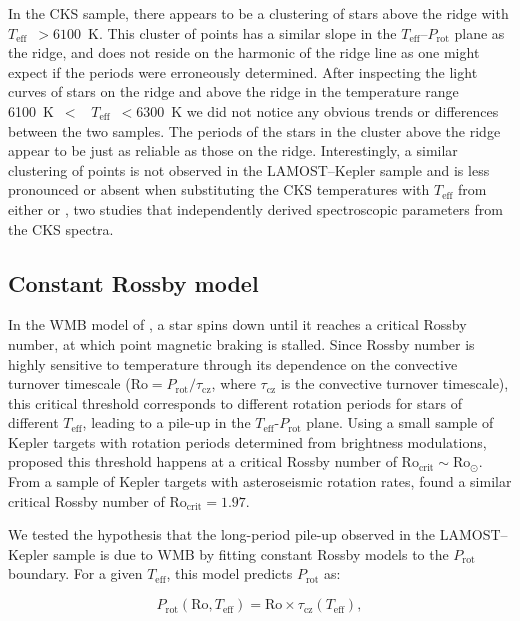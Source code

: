 \documentclass[linenumbers,tighten,trackchanges,twocolumn]{aastex631}
\newcommand{\teff}{\ensuremath{T_{\mathrm{eff}}}\xspace}
\newcommand{\prot}{\ensuremath{P_\mathrm{rot}}\xspace}
\begin{document}
In the CKS sample, there appears to be a clustering of stars above the ridge with \teff~$>6100$~K. This cluster of points has a similar slope in the \teff--\prot plane as the ridge, and does not reside on the harmonic of the ridge line as one might expect if the periods were erroneously determined. After inspecting the light curves of stars on the ridge and above the ridge in the temperature range 6100~K~$<$~ \teff~$<6300$~K we did not notice any obvious trends or differences between the two samples. The periods of the stars in the cluster above the ridge appear to be just as reliable as those on the ridge. Interestingly, a similar clustering of points is not observed in the LAMOST--Kepler sample and is less pronounced or absent when substituting the CKS temperatures with \teff from either \citet{Brewer2018} or \citet{Martinez2019}, two studies that independently derived spectroscopic parameters from the CKS spectra. 

\subsection{Constant Rossby model}
\label{subsec:rossby}
In the WMB model of \citet{vanSaders2016, vanSaders2019}, a star spins down until it reaches a critical Rossby number, at which point magnetic braking is stalled. Since Rossby number is highly sensitive to temperature through its dependence on the convective turnover timescale ($\mathrm{Ro} = P_\mathrm{rot}/\tau_\mathrm{cz}$, where $\tau_\mathrm{cz}$ is the convective turnover timescale), this critical threshold corresponds to different rotation periods for stars of different \teff, leading to a pile-up in the \teff-\prot plane. Using a small sample of Kepler targets with rotation periods determined from brightness modulations, \citet{vanSaders2016} proposed this threshold happens at a critical Rossby number of $\mathrm{Ro_{crit}} \sim \mathrm{Ro_\odot}$. From a sample of Kepler targets with asteroseismic rotation rates, \citet{Hall2021} found a similar critical Rossby number of $\mathrm{Ro_{crit}} = 1.97$.

We tested the hypothesis that the long-period pile-up observed in the LAMOST--Kepler sample is due to WMB by fitting constant Rossby models to the \prot boundary. For a given \teff, this model predicts \prot as: 

\begin{equation}
    \prot (\mathrm{Ro}, \teff) = \mathrm{Ro} \times \tau_\mathrm{cz}(\teff),
\end{equation}
\end{document}
